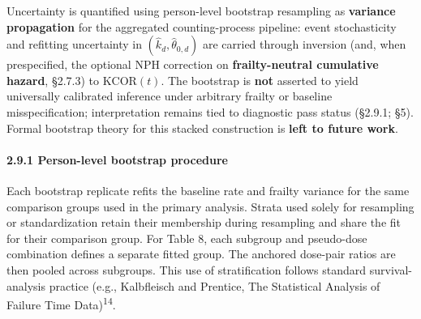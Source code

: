 \documentclass[
]{article}
\begin{document}
Uncertainty is quantified using person-level bootstrap resampling as \textbf{variance propagation} for the aggregated counting-process pipeline: event stochasticity and refitting uncertainty in \((\hat{k}_d,\hat{\theta}_{0,d})\) are carried through inversion (and, when prespecified, the optional NPH correction on \textbf{frailty-neutral cumulative hazard}, §2.7.3) to \(\mathrm{KCOR}(t)\). The bootstrap is \textbf{not} asserted to yield universally calibrated inference under arbitrary frailty or baseline misspecification; interpretation remains tied to diagnostic pass status (§2.9.1; §5). Formal bootstrap theory for this stacked construction is \textbf{left to future work}.

\paragraph{2.9.1 Person-level bootstrap procedure}\label{person-level-bootstrap-procedure}

Each bootstrap replicate refits the baseline rate and frailty variance for the same comparison groups used in the primary analysis. Strata used solely for resampling or standardization retain their membership during resampling and share the fit for their comparison group. For Table 8, each subgroup and pseudo-dose combination defines a separate fitted group. The anchored dose-pair ratios are then pooled across subgroups. This use of stratification follows standard survival-analysis practice (e.g., Kalbfleisch and Prentice, The Statistical Analysis of Failure Time Data)\textsuperscript{14}.
\end{document}
